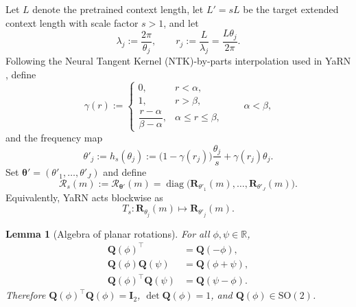 \documentclass[11pt]{article}
\newtheorem{lemma}{Lemma}
\begin{document}
Let \(L\) denote the pretrained context length, let \(L'=sL\) be the target extended context length with scale factor \(s>1\), and let
\begin{equation}
\lambda_j := \frac{2\pi}{\theta_j},
\qquad
r_j := \frac{L}{\lambda_j} = \frac{L\theta_j}{2\pi}.
\label{eq:yarn-wavelength-ratio}
\end{equation}
Following the Neural Tangent Kernel (NTK)-by-parts interpolation used in YaRN \citep{peng2023yarn}, define
\begin{equation}
\gamma(r)
:=
\begin{cases}
0, & r<\alpha,\\[3pt]
1, & r>\beta,\\[3pt]
\dfrac{r-\alpha}{\beta-\alpha}, & \alpha \le r \le \beta,
\end{cases}
\qquad \alpha<\beta,
\label{eq:yarn-ramp}
\end{equation}
and the frequency map
\begin{equation}
\theta'_j
:=
h_s(\theta_j)
:=
\bigl(1-\gamma(r_j)\bigr)\frac{\theta_j}{s}
+
\gamma(r_j)\theta_j.
\label{eq:yarn-frequency-map}
\end{equation}
Set \(\boldsymbol\theta'=(\theta'_1,\dots,\theta'_J)\) and define
\begin{equation}
\mathcal R_s(m)
:=
\mathcal R_{\boldsymbol\theta'}(m)
=
\operatorname{diag}\!\bigl(
\mathbf R_{\theta'_1}(m),\dots,\mathbf R_{\theta'_J}(m)
\bigr).
\label{eq:yarn-scaled-operator}
\end{equation}
Equivalently, YaRN acts blockwise as
\begin{equation}
T_s:\mathbf R_{\theta_j}(m)\longmapsto \mathbf R_{\theta'_j}(m).
\label{eq:yarn-block-transform}
\end{equation}

\begin{lemma}[Algebra of planar rotations]
\label{lem:yarn-rotation-identities}
For all \(\phi,\psi\in\mathbb R\),
\begin{align}
\mathbf Q(\phi)^\top &= \mathbf Q(-\phi), \label{eq:yarn-transpose}\\
\mathbf Q(\phi)\mathbf Q(\psi) &= \mathbf Q(\phi+\psi), \label{eq:yarn-composition}\\
\mathbf Q(\phi)^\top \mathbf Q(\psi) &= \mathbf Q(\psi-\phi). \label{eq:yarn-relative}
\end{align}
Therefore \(\mathbf Q(\phi)^\top\mathbf Q(\phi)=\mathbf I_2\), \(\det\mathbf Q(\phi)=1\), and \(\mathbf Q(\phi)\in \mathrm{SO}(2)\).
\end{lemma}
\end{document}
